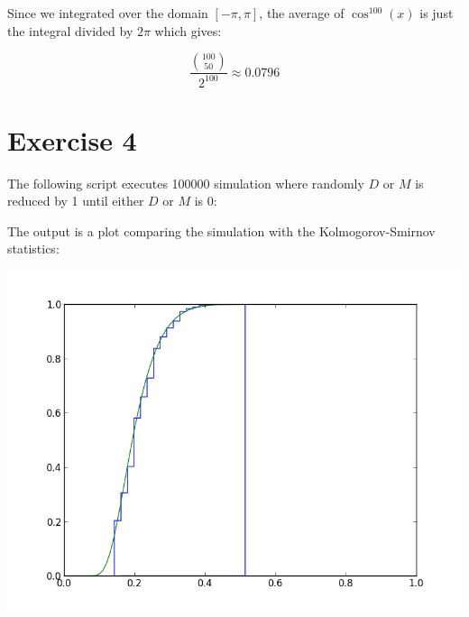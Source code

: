 \documentclass[%
]
{scrartcl}
\theoremstyle{plain}
\begin{document}
Since we integrated over the domain $[-\pi,\pi]$, the average of $\cos^{100}(x)$ is just the integral divided by $2\pi$ which gives:

\begin{equation*}
\frac{\binom{100}{50}}{2^{100}}\approx 0.0796
\end{equation*}

\section*{Exercise 4}

The following script executes 100000 simulation where randomly $D$ or $M$ is reduced by 1 until either $D$ or $M$ is 0:



The output is a plot comparing the simulation with the Kolmogorov-Smirnov statistics:

\begin{center}
\centering
\includegraphics[width=0.6\linewidth]{../KSStatistics.png}
\end{center}

%
\end{document}
